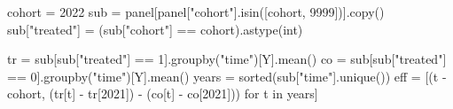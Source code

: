 \documentclass[
  letterpaper,
  10pt,
  twoside,
  openright,
  numbers=noenddot,
  chapterprefix=true]{scrbook}
\newenvironment{Shaded}{}{}
\newcommand{\BuiltInTok}[1]{\textcolor[rgb]{0.84,0.23,0.29}{#1}}
\newcommand{\ControlFlowTok}[1]{\textcolor[rgb]{0.84,0.23,0.29}{#1}}
\newcommand{\DecValTok}[1]{\textcolor[rgb]{0.00,0.36,0.77}{#1}}
\newcommand{\KeywordTok}[1]{\textcolor[rgb]{0.84,0.23,0.29}{#1}}
\newcommand{\NormalTok}[1]{\textcolor[rgb]{0.14,0.16,0.18}{#1}}
\newcommand{\OperatorTok}[1]{\textcolor[rgb]{0.14,0.16,0.18}{#1}}
\newcommand{\StringTok}[1]{\textcolor[rgb]{0.01,0.18,0.38}{#1}}
\begin{document}
\begin{Shaded}
\begin{Highlighting}[]
\NormalTok{cohort }\OperatorTok{=} \DecValTok{2022}
\NormalTok{sub }\OperatorTok{=}\NormalTok{ panel[panel[}\StringTok{"cohort"}\NormalTok{].isin([cohort, }\DecValTok{9999}\NormalTok{])].copy()}
\NormalTok{sub[}\StringTok{"treated"}\NormalTok{] }\OperatorTok{=}\NormalTok{ (sub[}\StringTok{"cohort"}\NormalTok{] }\OperatorTok{==}\NormalTok{ cohort).astype(}\BuiltInTok{int}\NormalTok{)}

\NormalTok{tr }\OperatorTok{=}\NormalTok{ sub[sub[}\StringTok{"treated"}\NormalTok{] }\OperatorTok{==} \DecValTok{1}\NormalTok{].groupby(}\StringTok{"time"}\NormalTok{)[Y].mean()}
\NormalTok{co }\OperatorTok{=}\NormalTok{ sub[sub[}\StringTok{"treated"}\NormalTok{] }\OperatorTok{==} \DecValTok{0}\NormalTok{].groupby(}\StringTok{"time"}\NormalTok{)[Y].mean()}
\NormalTok{years }\OperatorTok{=} \BuiltInTok{sorted}\NormalTok{(sub[}\StringTok{"time"}\NormalTok{].unique())}
\NormalTok{eff }\OperatorTok{=}\NormalTok{ [(t }\OperatorTok{{-}}\NormalTok{ cohort, (tr[t] }\OperatorTok{{-}}\NormalTok{ tr[}\DecValTok{2021}\NormalTok{]) }\OperatorTok{{-}}\NormalTok{ (co[t] }\OperatorTok{{-}}\NormalTok{ co[}\DecValTok{2021}\NormalTok{])) }\ControlFlowTok{for}\NormalTok{ t }\KeywordTok{in}\NormalTok{ years]}


\end{Highlighting}
\end{Shaded}
\end{document}
